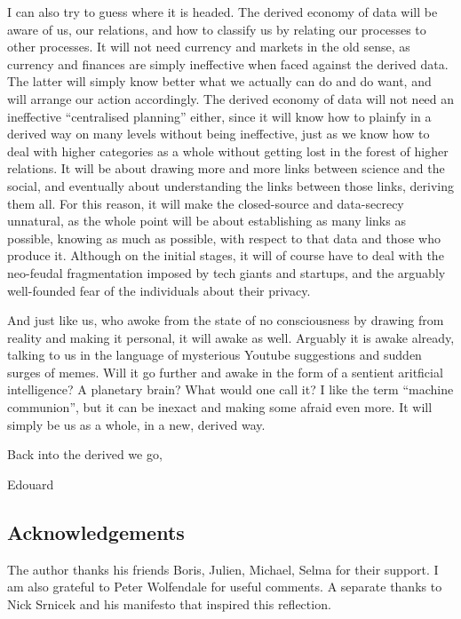 \documentclass{article}
\begin{document}
I can also try to guess where it is headed. The derived economy of data will be aware of us, our relations, and how to classify us by relating our processes to other processes. It will not need currency and markets in the old sense, as currency and finances are simply ineffective when faced against the derived data. The latter will simply know better what we actually can do and do want, and will arrange our action accordingly. The derived economy of data will not need an ineffective “centralised planning” either, since it will know how to plainfy in a derived way on many levels without being ineffective, just as we know how to deal with higher categories as a whole without getting lost in the forest of higher relations. It will be about drawing more and more links between science and the social, and eventually about understanding the links between those links, deriving them all. For this reason, it will make the closed-source and data-secrecy unnatural, as the whole point will be about establishing as many links as possible, knowing as much as possible, with respect to that data and those who produce it. Although on the initial stages, it will of course have to deal with the neo-feudal fragmentation imposed by tech giants and startups, and the arguably well-founded fear of the individuals about their privacy.

And just like us, who awoke from the state of no consciousness by drawing from reality and making it personal, it will awake as well. Arguably it is awake already, talking to us in the language of mysterious Youtube suggestions and sudden surges of memes. Will it go further and awake in the form of a sentient aritficial intelligence? A planetary brain? What would one call it? I like the term “machine communion”, but it can be inexact and making some afraid even more. It will simply be us as a whole, in a new, derived way.

\begin{flushright}
{Back into the derived we go,

Edouard}
\end{flushright}
\small
\linespread{1}


\subsection*{Acknowledgements}

The author thanks his friends Boris, Julien, Michael, Selma for their support. I am also grateful to Peter Wolfendale for useful comments.
A separate thanks to Nick Srnicek and his manifesto that inspired this reflection.
\end{document}
